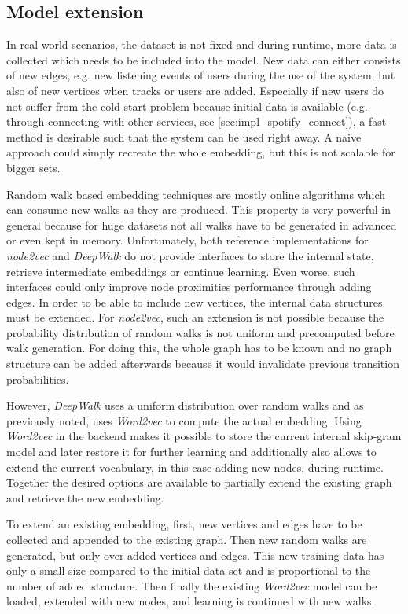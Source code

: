 \documentclass[sigconf]{acmart}
\begin{document}
\subsection{Model extension}
\label{sec:model_extension}
In real world scenarios, the dataset is not fixed and during runtime, more data is collected which needs to be included into the model. New data can either consists of new edges, e.g. new listening events of users during the use of the system, but also of new vertices when tracks or users are added. Especially if new users do not suffer from the cold start problem because initial data is available (e.g. through connecting with other services, see \ref{sec:impl_spotify_connect}), a fast method is desirable such that the system can be used right away. A naive approach could simply recreate the whole embedding, but this is not scalable for bigger sets. 

Random walk based embedding techniques are mostly online algorithms which can consume new walks as they are produced. This property is very powerful in general because for huge datasets not all walks have to be generated in advanced or even kept in memory. Unfortunately, both reference implementations for \emph{node2vec} and \emph{DeepWalk} do not provide interfaces to store the internal state, retrieve intermediate embeddings or continue learning. Even worse, such interfaces could only improve node proximities performance through adding edges. In order to be able to include new vertices, the internal data structures must be extended. For \emph{node2vec}, such an extension is not possible because the probability distribution of random walks is not uniform and precomputed before walk generation. For doing this, the whole graph has to be known and no graph structure can be added afterwards because it would invalidate previous transition probabilities.

However, \emph{DeepWalk} uses a uniform distribution over random walks and as previously noted, uses \emph{Word2vec} to compute the actual embedding. Using  \emph{Word2vec} in the backend makes it possible to store the current internal skip-gram model and later restore it for further learning and additionally also allows to extend the current vocabulary, in this case adding new nodes, during runtime. Together the desired options are available to partially extend the existing graph and retrieve the new embedding.

To extend an existing embedding, first, new vertices and edges have to be collected and appended to the existing graph. Then new random walks are generated, but only over added vertices and edges. This new training data has only a small size compared to the initial data set and is proportional to the number of added structure. Then finally the existing \emph{Word2vec} model can be loaded, extended with new nodes, and learning is continued with new walks. \\
\end{document}
